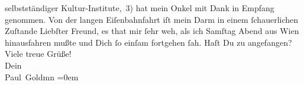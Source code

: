 \begin{ledgroupsized}[t]{13cm}
{{{                     selbstständiger Kultur-Institute, 3)}}}\label{K_L02891-2h} hat mein Onkel mit
               Dank in Empfang genommen.\pend
           \pstart
           Von der langen Eiſenbahnfahrt iſt mein Darm in einem ſchauerlichen Zuſtande{\dotsseven}\pend
           \pstart
           Liebſter Freund, es that mir ſehr weh, als ich Samſtag{ }Abend aus Wien hinausfahren mußte und
               Dich ſo einſam fortgehen ſah. Haſt Du zu \label{K_L02891-3v}\label{K_L02891-3h} angefangen?\pend
           \pstart
           Viele treue Grüße! {\\[\baselineskip]}Dein {\\[\baselineskip]}\spacefill\mbox{Paul Goldmn}\pend
           \leftskip=0em{}
         
         \endnumbering{}\end{ledgroupsized}  \newcommand{\dateiname}{L02891}\newcommand{\titel}{Paul Goldmann an Arthur Schnitzler, 23. 10. [1899]}\newcommand{\editorInnen}{Martin Anton Müller und Laura Untner}
      